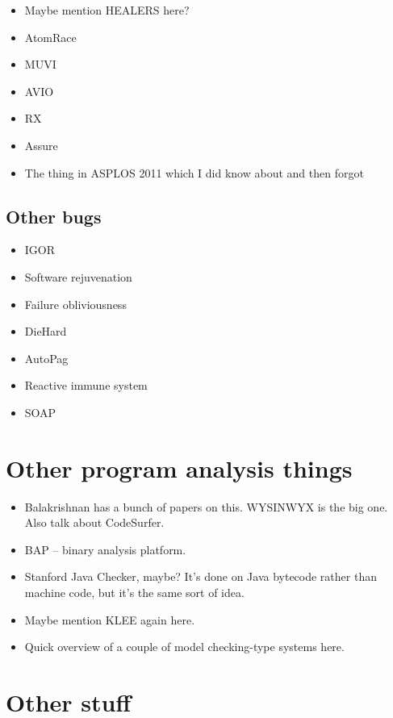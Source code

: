 \begin{itemize}
\item Maybe mention HEALERS here?
\item AtomRace
\item MUVI
\item AVIO
\item RX
\item Assure
\item The thing in ASPLOS 2011 which I did know about and then forgot
\end{itemize}

\subsection{Other bugs}

\begin{itemize}
\item IGOR
\item Software rejuvenation
\item Failure obliviousness
\item DieHard
\item AutoPag
\item Reactive immune system
\item SOAP
\end{itemize}

\section{Other program analysis things}

\begin{itemize}
\item Balakrishnan has a bunch of papers on this.  WYSINWYX is the big
  one.  Also talk about CodeSurfer.
\item BAP -- binary analysis platform.
\item Stanford Java Checker, maybe?  It's done on Java bytecode rather
  than machine code, but it's the same sort of idea.
\item Maybe mention KLEE again here.
\item Quick overview of a couple of model checking-type systems here.
\end{itemize}

\section{Other stuff}

